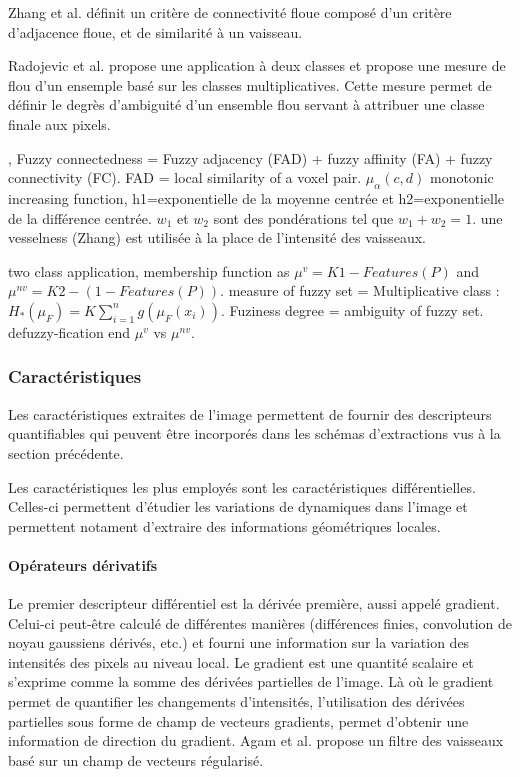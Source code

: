 Zhang et al. \cite{Zhang2018_liver_fuzzy_connectedness} définit un critère de connectivité floue composé d'un critère d'adjacence floue, et de similarité à un vaisseau.

Radojevic et al.\cite{Radojevic2015_fuzzy_logic} propose une application à deux classes et propose une mesure de flou d'un ensemple basé sur les classes multiplicatives. Cette mesure permet de définir le degrès d'ambiguité d'un ensemble flou servant à attribuer une classe finale aux pixels. 

\cite{Zhang2018_liver_fuzzy_connectedness}, Fuzzy connectedness = Fuzzy adjacency (FAD) + fuzzy affinity (FA) + fuzzy connectivity (FC).
FAD = local similarity of a voxel pair. $\mu_{\alpha}(c,d)$ monotonic increasing function, h1=exponentielle de la moyenne centrée et h2=exponentielle de la différence centrée. $w_1$ et $w_2$ sont des pondérations tel que $w_1 + w_2 = 1$. une vesselness (Zhang) est utilisée à la place de l'intensité des vaisseaux. 
\cite{Caponetti2014_fuzzy_morphology}

\cite{Radojevic2015_fuzzy_logic} two class application, membership function as $\mu^v=K1-Features(P)$ and $\mu^{nv}=K2-(1-Features(P))$. measure of fuzzy set = Multiplicative class : $H_*(\mu_F) = K\sum^{n}_{i=1}g( \mu_F(x_i) )$. Fuziness degree = ambiguity of fuzzy set. defuzzy-fication end $\mu^v$ vs $\mu^{nv}$.

\cite{Sigurosson2014_retinal_morpho_fuzzy} 

\subsubsection{Caractéristiques}

Les caractéristiques extraites de l'image permettent de fournir des descripteurs quantifiables qui peuvent être incorporés dans les schémas d'extractions vus à la section précédente.

Les caractéristiques les plus employés sont les caractéristiques différentielles. Celles-ci permettent d'étudier les variations de dynamiques dans l'image et permettent notament d'extraire des informations géométriques locales.

\paragraph{Opérateurs dérivatifs}

Le premier descripteur différentiel est la dérivée première, aussi appelé gradient. Celui-ci peut-être calculé de différentes manières (différences finies, convolution de noyau gaussiens dérivés, etc.) et fourni une information sur la variation des intensités des pixels au niveau local. Le gradient est une quantité scalaire et s'exprime comme la somme des dérivées partielles de l'image. Là où le gradient permet de quantifier les changements d'intensités, l'utilisation des dérivées partielles sous forme de champ de vecteurs gradients, permet d'obtenir une information de direction du gradient. Agam et al. \cite{Agam2005_vessel_1st_order} propose un filtre des vaisseaux basé sur un champ de vecteurs régularisé.
 

